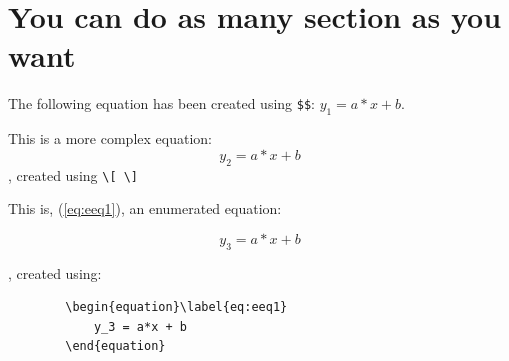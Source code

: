 \documentclass[a4paper,12pt]{article}
\begin{document}
 \begin{table}[h!tb]
   \centering \caption{Table caption}
   \label{tab:TableName}
   \vskip 0.2cm
 \end{table}

\newpage

\section{You can do as many section as you want}
The following equation has been created using \verb.$$.: $ y_1 = a*x + b$.

\smallskip

\noindent
This is a more complex equation: \[ y_2 = a*x + b \], created using \verb.\[ \].

\bigskip

\noindent
This is, (\ref{eq:eeq1}), an enumerated equation: 

	\begin{equation}\label{eq:eeq1}
		y_3 = a*x + b
	\end{equation}

, created using:

	\begin{verbatim}
		\begin{equation}\label{eq:eeq1}
		    y_3 = a*x + b
		\end{equation}
	\end{verbatim}


\newpage



\end{document}
